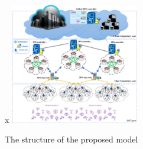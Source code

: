 \documentclass[conference]{IEEEtran}
\begin{document}
	\begin{figure}
x		\centering
		\includegraphics[width=0.5\textwidth]{figures/mfo-architecture.png}
		\caption{The structure of the proposed model \cite{caching-1}}
		\label{fig:mfo-architecture}
	\end{figure}
\end{document}
